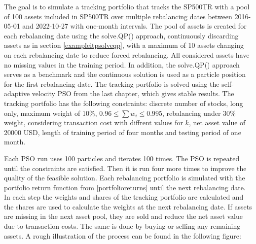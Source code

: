 \documentclass[
  oneside]{book}
\begin{document}
The goal is to simulate a tracking portfolio that tracks the SP500TR with a pool of 100 assets included in SP500TR over multiple rebalancing dates between 2016-05-01 and 2022-10-27 with one-month intervals. The pool of assets is created for each rebalancing date using the solve.QP() approach, continuously discarding assets as in section \ref{exampleitpsolveqp}, with a maximum of 10 assets changing on each rebalancing date to reduce forced rebalancing. All considered assets have no missing values in the training period. In addition, the solve.QP() approach serves as a benchmark and the continuous solution is used as a particle position for the first rebalancing date. The tracking portfolio is solved using the self-adaptive velocity PSO from the last chapter, which gives stable results. The tracking portfolio has the following constraints: discrete number of stocks, long only, maximum weight of 10\%, \(0.96 \leq \sum w_i \leq 0.995\), rebalancing under 30\% weight, considering transaction cost with diffrent values for \(k\), net asset value of 20000 USD, length of training period of four months and testing period of one month.

Each PSO run uses 100 particles and iterates 100 times. The PSO is repeated until the constraints are satisfied. Then it is run four more times to improve the quality of the feasible solution. Each rebalancing portfolio is simulated with the portfolio return function from \ref{portfolioreturns} until the next rebalancing date. In each step the weights and shares of the tracking portfolio are calculated and the shares are used to calculate the weights at the next rebalancing date. If assets are missing in the next asset pool, they are sold and reduce the net asset value due to transaction costs. The same is done by buying or selling any remaining assets. A rough illustration of the process can be found in the following figure:
\end{document}
